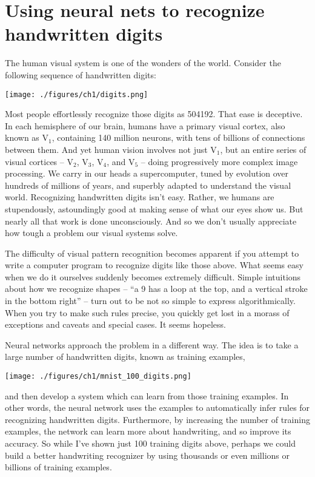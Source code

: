 \documentclass[a4paper,twoside,10pt]{book}
\begin{document}
\chapter{Using neural nets to recognize handwritten digits}

The human visual system is one of the wonders of the world. Consider the following sequence of handwritten digits:
\begin{center}
	\texttt{[image: ./figures/ch1/digits.png]}
\end{center}
Most people effortlessly recognize those digits as 504192. That ease is deceptive. In each hemisphere of our brain, humans have a primary visual cortex, also known as V$_1$, containing 140 million neurons, with tens of billions of connections between them. And yet human vision involves not just V$_1$, but an entire series of visual cortices -- V$_2$, V$_3$, V$_4$, and V$_5$ -- doing progressively more complex image processing. We carry in our heads a supercomputer, tuned by evolution over hundreds of millions of years, and superbly adapted to understand the visual world. Recognizing handwritten digits isn't easy. Rather, we humans are stupendously, astoundingly good at making sense of what our eyes show us. But nearly all that work is done unconsciously. And so we don't usually appreciate how tough a problem our visual systems solve.

The difficulty of visual pattern recognition becomes apparent if you attempt to write a computer program to recognize digits like those above. What seems easy when we do it ourselves suddenly becomes extremely difficult. Simple intuitions about how we recognize shapes -- ``a 9 has a loop at the top, and a vertical stroke in the bottom right'' -- turn out to be not so simple to express algorithmically. When you try to make such rules precise, you quickly get lost in a morass of exceptions and caveats and special cases. It seems hopeless.

Neural networks approach the problem in a different way. The idea is to take a large number of handwritten digits, known as training examples,
\begin{center}
	\texttt{[image: ./figures/ch1/mnist\_100\_digits.png]}
\end{center}
and then develop a system which can learn from those training examples. In other words, the neural network uses the examples to automatically infer rules for recognizing handwritten digits. Furthermore, by increasing the number of training examples, the network can learn more about handwriting, and so improve its accuracy. So while I've shown just 100 training digits above, perhaps we could build a better handwriting recognizer by using thousands or even millions or billions of training examples.
\end{document}
